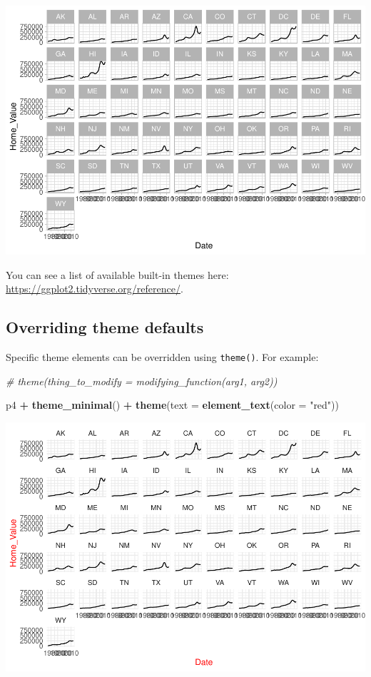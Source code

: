 \documentclass[
]{book}
\newenvironment{Shaded}{\begin{snugshade}}{\end{snugshade}}
\newcommand{\CommentTok}[1]{\textcolor[rgb]{0.56,0.35,0.01}{\textit{#1}}}
\newcommand{\DataTypeTok}[1]{\textcolor[rgb]{0.13,0.29,0.53}{#1}}
\newcommand{\KeywordTok}[1]{\textcolor[rgb]{0.13,0.29,0.53}{\textbf{#1}}}
\newcommand{\NormalTok}[1]{#1}
\newcommand{\OperatorTok}[1]{\textcolor[rgb]{0.81,0.36,0.00}{\textbf{#1}}}
\newcommand{\StringTok}[1]{\textcolor[rgb]{0.31,0.60,0.02}{#1}}
\begin{document}
\includegraphics{R/Rgraphics/figures/unnamed-chunk-211-1.pdf}

You can see a list of available built-in themes here: \url{https://ggplot2.tidyverse.org/reference/}.

\hypertarget{overriding-theme-defaults}{%
\subsection{Overriding theme defaults}\label{overriding-theme-defaults}}

Specific theme elements can be overridden using \texttt{theme()}. For example:

\begin{Shaded}
\begin{Highlighting}[]
\CommentTok{\# theme(thing\_to\_modify = modifying\_function(arg1, arg2))}

\NormalTok{p4 }\OperatorTok{+}\StringTok{ }\KeywordTok{theme\_minimal}\NormalTok{() }\OperatorTok{+}
\StringTok{  }\KeywordTok{theme}\NormalTok{(}\DataTypeTok{text =} \KeywordTok{element\_text}\NormalTok{(}\DataTypeTok{color =} \StringTok{"red"}\NormalTok{))  }
\end{Highlighting}
\end{Shaded}

\includegraphics{R/Rgraphics/figures/unnamed-chunk-212-1.pdf}
\end{document}
